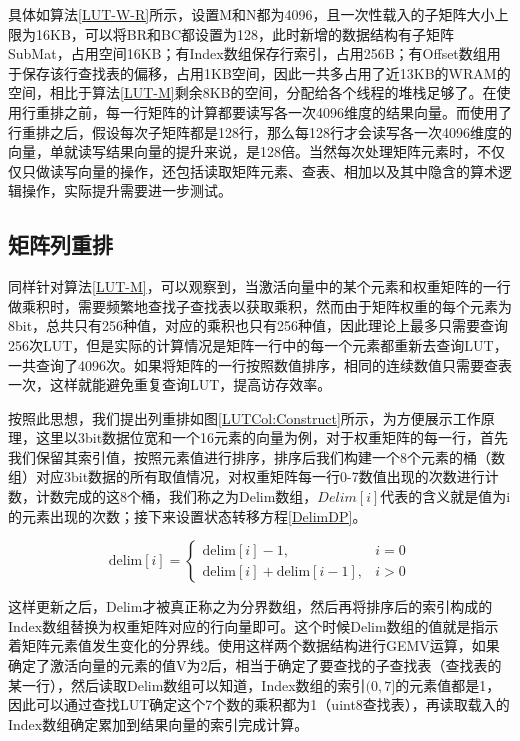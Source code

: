 具体如算法\ref{LUT-W-R}所示，设置M和N都为4096，且一次性载入的子矩阵大小上限为16KB，可以将BR和BC都设置为128，此时新增的数据结构有子矩阵SubMat，占用空间16KB；有Index数组保存行索引，占用256B；有Offset数组用于保存该行查找表的偏移，占用1KB空间，因此一共多占用了近13KB的WRAM的空间，相比于算法\ref{LUT-M}剩余8KB的空间，分配给各个线程的堆栈足够了。在使用行重排之前，每一行矩阵的计算都要读写各一次4096维度的结果向量。而使用了行重排之后，假设每次子矩阵都是128行，那么每128行才会读写各一次4096维度的向量，单就读写结果向量的提升来说，是128倍。当然每次处理矩阵元素时，不仅仅只做读写向量的操作，还包括读取矩阵元素、查表、相加以及其中隐含的算术逻辑操作，实际提升需要进一步测试。

\subsection{矩阵列重排}
同样针对算法\ref{LUT-M}，可以观察到，当激活向量中的某个元素和权重矩阵的一行做乘积时，需要频繁地查找子查找表以获取乘积，然而由于矩阵权重的每个元素为8bit，总共只有256种值，对应的乘积也只有256种值，因此理论上最多只需要查询256次LUT，但是实际的计算情况是矩阵一行中的每一个元素都重新去查询LUT，一共查询了4096次。如果将矩阵的一行按照数值排序，相同的连续数值只需要查表一次，这样就能避免重复查询LUT，提高访存效率。

按照此思想，我们提出列重排如图\ref{LUTCol:Construct}所示，为方便展示工作原理，这里以3bit数据位宽和一个16元素的向量为例，对于权重矩阵的每一行，首先我们保留其索引值，按照元素值进行排序，排序后我们构建一个8个元素的桶（数组）对应3bit数据的所有取值情况，对权重矩阵每一行0-7数值出现的次数进行计数，计数完成的这8个桶，我们称之为Delim数组，$Delim[i]$代表的含义就是值为i的元素出现的次数；接下来设置状态转移方程\ref{DelimDP}。

\begin{equation}
    \text{delim}[i] = \begin{cases}
        \text{delim}[i] - 1, & i = 0 \\
        \text{delim}[i] + \text{delim}[i - 1], & i > 0
    \end{cases}
    \label{DelimDP}
\end{equation}

这样更新之后，Delim才被真正称之为分界数组，然后再将排序后的索引构成的Index数组替换为权重矩阵对应的行向量即可。这个时候Delim数组的值就是指示着矩阵元素值发生变化的分界线。使用这样两个数据结构进行GEMV运算，如果确定了激活向量的元素的值V为2后，相当于确定了要查找的子查找表（查找表的某一行），然后读取Delim数组可以知道，Index数组的索引$(0,7]$的元素值都是1，因此可以通过查找LUT确定这个7个数的乘积都为1（uint8查找表），再读取载入的Index数组确定累加到结果向量的索引完成计算。

